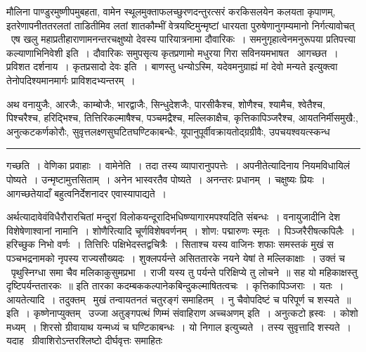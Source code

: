\documentclass[11pt, openany]{book}
\begin{document}
\newpage

\noindent
मौलिना पाण्डुरमुष्णीपमुबहता, वामेन स्थूलमुक्ताफलच्छुरणदन्तुरत्सरं करकिसलयेन कलयता कृपाणम्, इतरेणापनीततरलतां ताडितीमिव लतां शातकौम्भीं वेत्रयष्टिमुन्मृष्टां धारयता पुरुषेणानुगम्यमानो निर्गत्यावोचत् \textendash\ {\haq एष खलु महाप्रतीहाराणामनन्तरचक्षुष्यो देवस्य पारियात्रनामा दौवारिकः~। समनुगृहात्वेनमनुरूपया प्रतिपत्त्या कल्याणाभिनिवेशी} इति~। दौवारिकः समुपसृत्य कृतप्रणामो मधुरया गिरा सविनयमभाषत \textendash\ {\haq आगच्छत~। प्रविशत दर्शनाय~। कृतप्रसादो देवः} इति~। बाणस्तु {\haq धन्योऽस्मि, यदेवमनुग्राह्यं मां देवो मन्यते} इत्युक्त्वा तेनोपदिश्यमानमार्गः प्राविशदभ्यन्तरम्~।

अथ वनायुजैः, आरजैः, काम्बोजैः, भारद्वाजैः, सिन्धुदेशजैः, पारसीकैश्च, शोणैश्च, श्यामैच, श्वेतैश्च, पिश्चरैश्च, हरिद्भिश्च, तित्तिरिकल्माषैश्च, पञ्चमद्रैश्च, मल्लिकाक्षैच, कृत्तिकापिञ्जरैश्च, आयतनिर्मीसमुखै:, अनुत्कटकर्णकोरौः, सुवृत्तलक्ष्णसुघटितघण्टिकाबन्धैः, यूपानुपूर्वीवक्रायतोद्ग्रग्रीवैः, उपचयश्वयत्स्कन्ध\textendash

\vspace{2mm}
\hrule

\noindent
{\s गच्छति~। वेणिका प्रवाहाः~। {\qtt वामेनेति}~। तदा तस्य व्यापारानुपपत्तेः~। अपनीतेत्यादिनाय नियमविधायिलं पोष्यते~। उन्मृष्टामुत्तसिताम्~। अनेन भास्वरतैव पोष्यते~। अनन्तरः प्रधानम्~। चक्षुष्यः प्रियः~। आगच्छतेयादाँ बहुत्वनिर्देशनादर एवास्यापाद्यते~।

अर्थत्यादावेवंविधैरौरारचितां मन्दुरां विलोकयन्दूरादिभधिष्ण्यागारमपश्यदिति संबन्धः~। वनायुजादीनि देश विशेषेणाश्वानां नामानि~। शोणैरित्यादि चूर्णविशेषवर्णनम्~। {\qt शोण: पद्मारुणः स्मृतः}~। पिञ्जरैरीषत्कपिलैः~। हरिच्छुक निभो वर्णः~। तित्तिरिः पक्षिभेदस्तद्वचित्रैः~। {\qt सिताश्च यस्य वाजिनः शफाः समस्तकं मुखं स पञ्चभद्रनामको नृपस्य राज्यसौख्यदः}~। शुक्लपर्यन्ते असिततारके नयने येषां ते मल्लिकाक्षाः~। उक्तं च \textendash\ {\qt पृथुस्निग्धा समा चैव मलिकाकुसुमप्रभा~। राजी यस्य तु पर्यन्ते परिक्षिप्ये तु लोचने~॥ सह यो महिकाक्षस्तु दृष्टिपर्यन्ततारकः~॥} इति तारका कदम्बककल्पानेकबिन्दुकल्माषितत्वचः~। कृत्तिकापिञ्जराः~। यतः~। {\qtt आयतेत्यादि}~। तदुक्तम् \textendash\ {\qt मुखं तन्वायतनतं चतुरङ्गं समाहितम्~। नु चैवोपदिष्टं च परिपूर्ण च शस्यते~॥} इति~। कृष्णेनाप्युक्तम् \textendash\ {\qt उज्जा अतुङ्गपत्थं णिम्मं संवाहिराण अच्चअणम्} इति~। अनुत्कटो ह्रस्वः~। कोशो मध्यम्~। शिरसो ग्रीवायाथ यन्मध्यं च घण्टिकाबन्धः~। यो निगाल इत्युच्यते~। तस्य सुवृत्तादि शस्यते~। यदाह \textendash\ ग्रीवाशिरोऽन्तरश्लिष्टो दीर्घवृत्तः समाहितः}

\newpage
\end{document}
